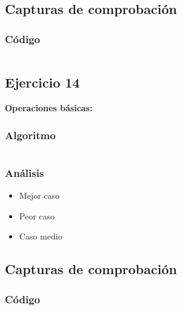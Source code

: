 \documentclass[12pt, letterpaper]{article}			%
\begin{document}
	        \subsection{Capturas de comprobación}

	        \subsubsection{Código}
	            \begin{lstlisting}[style=Java]
    		    \end{lstlisting}

	    \subsection{Ejercicio 14}
		\textbf{Operaciones básicas:}
			\subsubsection{Algoritmo}
			    \begin{lstlisting}[style=Java]
    		    \end{lstlisting}

    		\subsubsection{Análisis}
	    		\begin{itemize}
	    			\item[\Checklist] Mejor caso \\

	    			\item[\Checklist] Peor caso \\
					
					\item[\Checklist] Caso medio \\

				\end{itemize}

	        \subsection{Capturas de comprobación}

	        \subsubsection{Código}
	            \begin{lstlisting}[style=Java]
    		    \end{lstlisting}
\end{document}
